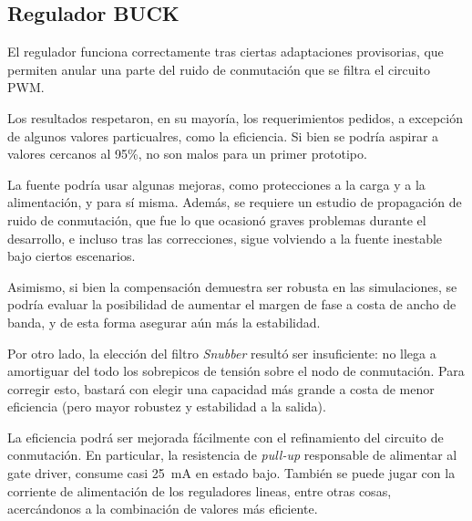 \subsection{Regulador BUCK}

El regulador funciona correctamente tras ciertas adaptaciones provisorias, que permiten anular una parte del ruido de conmutación que se filtra el circuito PWM.

Los resultados respetaron, en su mayoría, los requerimientos pedidos, a excepción de algunos valores particualres, como la eficiencia. Si bien se podría aspirar a valores cercanos al 95\%, no son malos para un primer prototipo.

La fuente podría usar algunas mejoras, como protecciones a la carga y a la alimentación, y para sí misma. Además, se requiere un estudio de propagación de ruido de conmutación, que fue lo que ocasionó graves problemas durante el desarrollo, e incluso tras las correcciones, sigue volviendo a la fuente inestable bajo ciertos escenarios.

Asimismo, si bien la compensación demuestra ser robusta en las simulaciones, se podría evaluar la posibilidad de aumentar el margen de fase a costa de ancho de banda, y de esta forma asegurar aún más la estabilidad.

Por otro lado, la elección del filtro \textit{Snubber} resultó ser insuficiente: no llega a amortiguar del todo los sobrepicos de tensión sobre el nodo de conmutación. Para corregir esto, bastará con elegir una capacidad más grande a costa de menor eficiencia (pero mayor robustez y estabilidad a la salida).

La eficiencia podrá ser mejorada fácilmente con el refinamiento del circuito de conmutación. En particular, la resistencia de \textit{pull-up} responsable de alimentar al gate driver, consume casi \SI{25}{mA} en estado bajo. También se puede jugar con la corriente de alimentación de los reguladores lineas, entre otras cosas, acercándonos a la combinación de valores más eficiente.
